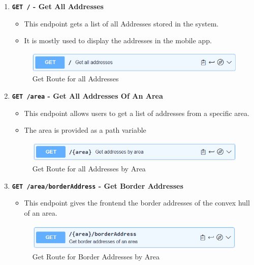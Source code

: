     \begin{enumerate}
        \item \textbf{\texttt{GET /} - Get All Addresses}
        \begin{itemize}
            \item This endpoint gets a list of all Addresses stored in the system. 
            \item It is mostly used to display the addresses in the mobile app.
        \end{itemize} 
        \begin{figure} [H]
            \centering
            \includegraphics [width=1\textwidth] {images/andreas/praxis/getAllAddresses.png}
            \caption{Get Route for all Addresses}
        \end{figure}

        \item \textbf{\texttt{GET /{area}} - Get All Addresses Of An Area}
        \begin{itemize}
            \item This endpoint allows users to get a list of addresses from a specific area.
            \item The area is provided as a path variable
        \end{itemize}
        \begin{figure} [H]
            \centering
            \includegraphics [width=1\textwidth] {images/andreas/praxis/getAddressesByArea.png}
            \caption{Get Route for all Addresses by Area}
        \end{figure}

        \item \textbf{\texttt{GET /{area}/borderAddress} - Get Border Addresses}
        \begin{itemize}
            \item This endpoint gives the frontend the border addresses of the convex hull of an area.
        \end{itemize} 
        \begin{figure} [H]
            \centering
            \includegraphics [width=1\textwidth] {images/andreas/praxis/getBorderAddressesOfArea.png}
            \caption{Get Route for Border Addresses by Area}
        \end{figure}
    \end{enumerate}    

